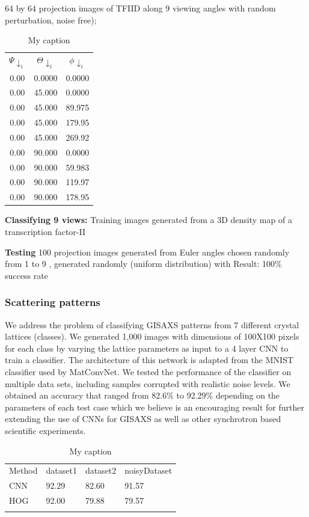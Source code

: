 64 by 64 projection images of TFIID along 9 viewing angles with random perturbation, noise free);

\begin{table}[]
\centering
\caption{My caption}
\label{my-label}
\begin{tabular}{|c|c|c|}
 $\Psi\downarrow_i$    & $\Theta\downarrow_i$       & $\phi\downarrow_i$       \\
0.00 & 0.0000 & 0.0000 \\
0.00 & 45.000 & 0.0000 \\
0.00 & 45.000 & 89.975 \\
0.00 & 45.000 & 179.95 \\
0.00 & 45.000 & 269.92 \\
0.00 & 90.000 & 0.0000 \\
0.00 & 90.000 & 59.983 \\
0.00 & 90.000 & 119.97 \\
0.00 & 90.000 & 178.95
\end{tabular}
\end{table}

\textbf{Classifying 9 views:}
Training images generated from a 3D density map of a transcription factor-II

\textbf{Testing}
100 projection images generated from Euler angles
 chosen randomly from 1 to 9
,  generated randomly (uniform distribution) with
Result: 100\% success rate

\subsubsection{Scattering patterns}
We address the problem of classifying GISAXS patterns from 7 different crystal lattices (classes). We generated 1,000 images with dimensions of 100X100 pixels for each class by varying the lattice parameters as input to a 4 layer CNN to train a classifier. The architecture of this network is adapted from the MNIST classifier used by MatConvNet. We tested the performance of the classifier on
multiple data sets, including samples corrupted with realistic noise levels. We obtained an accuracy that ranged from 82.6\% to 92.29\% depending on the parameters of each test case which we believe is an encouraging result for further extending the use of CNNs for GISAXS as well as other synchrotron based scientific experiments.

\begin{table}[]
\centering
\caption{My caption}
\label{my-label}
\begin{tabular}{llll}
Method & dataset1 & dataset2 & noisyDataset \\
CNN    & 92.29    & 82.60    & 91.57        \\
HOG    & 92.00    & 79.88    & 79.57        \\
       &          &          &
\end{tabular}
\end{table}

